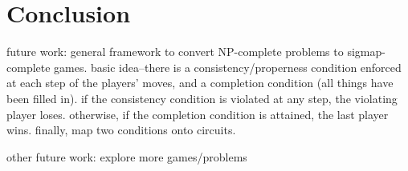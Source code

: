 \chapter{Conclusion}

future work: general framework to convert NP-complete problems to
sigmap-complete games.  basic idea--there is a consistency/properness condition
enforced at each step of the players' moves, and a completion condition (all
things have been filled in).  if the consistency condition is violated at any
step, the violating player loses.  otherwise, if the completion condition is
attained, the last player wins.  finally, map two conditions onto circuits.

other future work: explore more games/problems
